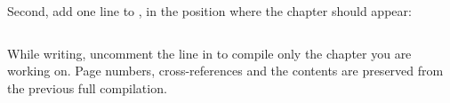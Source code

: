 \noindent Second, add one line to , in the position where the
chapter should appear:

\begin{lstlisting}[language={[LaTeX]TeX}]

\end{lstlisting}

\begin{tip}
While writing, uncomment the  line in  to
compile only the chapter you are working on. Page numbers, cross-references
and the contents are preserved from the previous full compilation.
\end{tip}
